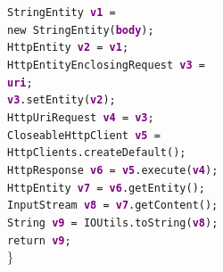 {{  \noindent\hspace*{0.2em}\texttt{StringEntity \textcolor{purple}{\textbf{v1}} = }\\
  \hspace*{0.5em}\texttt{new StringEntity(\textcolor{purple}{\textbf{body}});}\\
  \hspace*{0.2em}\texttt{HttpEntity \textcolor{purple}{\textbf{v2}} = \textcolor{purple}{\textbf{v1}};}\\
  \hspace*{0.2em}\texttt{HttpEntityEnclosingRequest \textcolor{purple}{\textbf{v3}} =}\\
  \hspace*{0.5em}\texttt{\textcolor{purple}{\textbf{uri}};}\\
  \hspace*{0.2em}\texttt{\textcolor{purple}{\textbf{v3}}.setEntity(\textcolor{purple}{\textbf{v2}});}\\
  \hspace*{0.2em}\texttt{HttpUriRequest \textcolor{purple}{\textbf{v4}} = \textcolor{purple}{\textbf{v3}};}\\
  \hspace*{0.2em}\texttt{CloseableHttpClient \textcolor{purple}{\textbf{v5}} =}\\ 
  \hspace*{0.5em}\texttt{HttpClients.createDefault();}\\
  \hspace*{0.2em}\texttt{HttpResponse \textcolor{purple}{\textbf{v6}} = \textcolor{purple}{\textbf{v5}}.execute(\textcolor{purple}{\textbf{v4}});}\\
  \hspace*{0.2em}\texttt{HttpEntity \textcolor{purple}{\textbf{v7}} = \textcolor{purple}{\textbf{v6}}.getEntity();}\\
  \hspace*{0.2em}\texttt{InputStream \textcolor{purple}{\textbf{v8}} = \textcolor{purple}{\textbf{v7}}.getContent();}\\
  \hspace*{0.2em}\texttt{String \textcolor{purple}{\textbf{v9}} = IOUtils.toString(\textcolor{purple}{\textbf{v8}});}\\
  \hspace*{0.2em}\texttt{return \textcolor{purple}{\textbf{v9}};}\\
\}

}

 
 }

